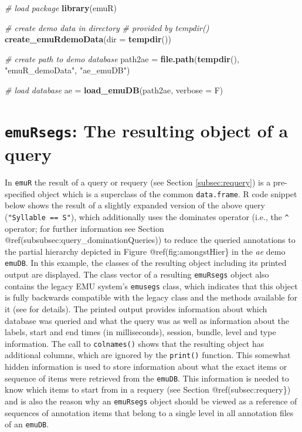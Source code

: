 \documentclass[]{book}
\newenvironment{Shaded}{\begin{snugshade}}{\end{snugshade}}
\newcommand{\CommentTok}[1]{\textcolor[rgb]{0.56,0.35,0.01}{\textit{#1}}}
\newcommand{\DataTypeTok}[1]{\textcolor[rgb]{0.13,0.29,0.53}{#1}}
\newcommand{\KeywordTok}[1]{\textcolor[rgb]{0.13,0.29,0.53}{\textbf{#1}}}
\newcommand{\NormalTok}[1]{#1}
\newcommand{\StringTok}[1]{\textcolor[rgb]{0.31,0.60,0.02}{#1}}
\begin{document}
\begin{Shaded}
\begin{Highlighting}[]
\CommentTok{# load package}
\KeywordTok{library}\NormalTok{(emuR)}

\CommentTok{# create demo data in directory}
\CommentTok{# provided by tempdir()}
\KeywordTok{create_emuRdemoData}\NormalTok{(}\DataTypeTok{dir =} \KeywordTok{tempdir}\NormalTok{())}

\CommentTok{# create path to demo database}
\NormalTok{path2ae =}\StringTok{ }\KeywordTok{file.path}\NormalTok{(}\KeywordTok{tempdir}\NormalTok{(), }\StringTok{"emuR_demoData"}\NormalTok{, }\StringTok{"ae_emuDB"}\NormalTok{)}

\CommentTok{# load database}
\NormalTok{ae =}\StringTok{ }\KeywordTok{load_emuDB}\NormalTok{(path2ae, }\DataTypeTok{verbose =}\NormalTok{ F)}
\end{Highlighting}
\end{Shaded}

\hypertarget{sec:query-emuRsegs}{%
\section{\texorpdfstring{\texttt{emuRsegs}: The resulting object of a query}{emuRsegs: The resulting object of a query}}\label{sec:query-emuRsegs}}

In \texttt{emuR} the result of a query or requery (see Section \ref{subsec:requery}) is a pre-specified object which is a superclass of the common \texttt{data.frame}. R code snippet below shows the result of a slightly expanded version of the above query (\texttt{"Syllable\ ==\ S"}), which additionally uses the dominates operator (i.e., the \texttt{\^{}} operator; for further information see Section @ref(subsubsec:query\_dominationQueries)) to reduce the queried annotations to the partial hierarchy depicted in Figure @ref(fig:amongstHier\} in the \emph{ae} demo \texttt{emuDB}. In this example, the classes of the resulting object including its printed output are displayed. The class vector of a resulting \texttt{emuRsegs} object also contains the legacy EMU system's \texttt{emusegs} class, which indicates that this object is fully backwards compatible with the legacy class and the methods available for it (see \citet{harrington:2010a} for details). The printed output provides information about which database was queried and what the query was as well as information about the labels, start and end times (in milliseconds), session, bundle, level and type information. The call to \texttt{colnames()} shows that the resulting object has additional columns, which are ignored by the \texttt{print()} function. This somewhat hidden information is used to store information about what the exact items or sequence of items were retrieved from the \texttt{emuDB}. This information is needed to know which items to start from in a requery (see Section @ref(subsec:requery\}) and is also the reason why an \texttt{emuRsegs} object should be viewed as a reference of sequences of annotation items that belong to a single level in all annotation files of an \texttt{emuDB}.
\end{document}
